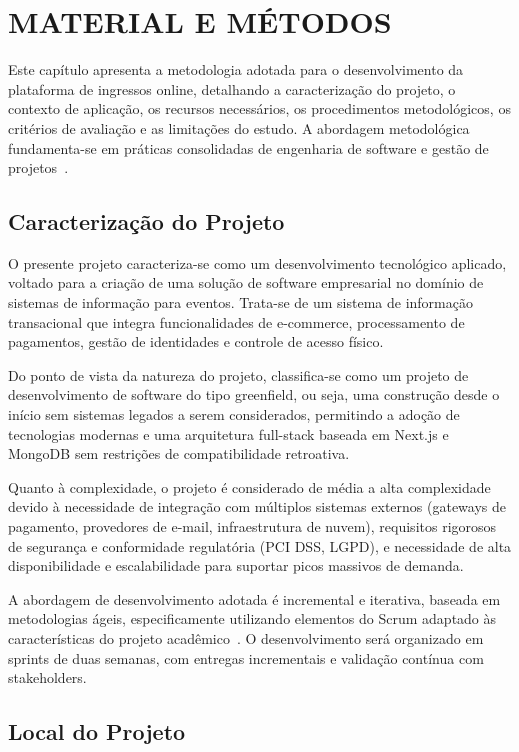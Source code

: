 \chapter{MATERIAL E MÉTODOS}

Este capítulo apresenta a metodologia adotada para o desenvolvimento da plataforma de ingressos online, detalhando a caracterização do projeto, o contexto de aplicação, os recursos necessários, os procedimentos metodológicos, os critérios de avaliação e as limitações do estudo. A abordagem metodológica fundamenta-se em práticas consolidadas de engenharia de software e gestão de projetos~\cite{Pressman:2019, Sommerville:2016}.

\section{Caracterização do Projeto}

O presente projeto caracteriza-se como um desenvolvimento tecnológico aplicado, voltado para a criação de uma solução de software empresarial no domínio de sistemas de informação para eventos. Trata-se de um sistema de informação transacional que integra funcionalidades de e-commerce, processamento de pagamentos, gestão de identidades e controle de acesso físico.

Do ponto de vista da natureza do projeto, classifica-se como um projeto de desenvolvimento de software do tipo greenfield, ou seja, uma construção desde o início sem sistemas legados a serem considerados, permitindo a adoção de tecnologias modernas e uma arquitetura full-stack baseada em Next.js e MongoDB sem restrições de compatibilidade retroativa.

Quanto à complexidade, o projeto é considerado de média a alta complexidade devido à necessidade de integração com múltiplos sistemas externos (gateways de pagamento, provedores de e-mail, infraestrutura de nuvem), requisitos rigorosos de segurança e conformidade regulatória (PCI DSS, LGPD), e necessidade de alta disponibilidade e escalabilidade para suportar picos massivos de demanda.

A abordagem de desenvolvimento adotada é incremental e iterativa, baseada em metodologias ágeis, especificamente utilizando elementos do Scrum adaptado às características do projeto acadêmico~\cite{Schwaber:2020}. O desenvolvimento será organizado em sprints de duas semanas, com entregas incrementais e validação contínua com stakeholders.

\section{Local do Projeto}

